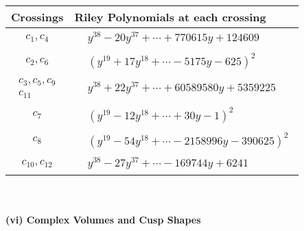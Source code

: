 \documentclass[1p]{elsarticle_modified}
\theoremstyle{definition}
\begin{document}
\begin{tabular}{m{50pt}|m{274pt}}
Crossings & \hspace{64pt}Riley Polynomials at each crossing \\
\hline $$\begin{aligned}c_{1},c_{4}\end{aligned}$$&$\begin{aligned}
&y^{38}-20 y^{37}+\cdots+770615 y+124609
\end{aligned}$\\
\hline $$\begin{aligned}c_{2},c_{6}\end{aligned}$$&$\begin{aligned}
&(y^{19}+17 y^{18}+\cdots-5175 y-625)^{2}
\end{aligned}$\\
\hline $$\begin{aligned}c_{3},c_{5},c_{9}\\c_{11}\end{aligned}$$&$\begin{aligned}
&y^{38}+22 y^{37}+\cdots+60589580 y+5359225
\end{aligned}$\\
\hline $$\begin{aligned}c_{7}\end{aligned}$$&$\begin{aligned}
&(y^{19}-12 y^{18}+\cdots+30 y-1)^{2}
\end{aligned}$\\
\hline $$\begin{aligned}c_{8}\end{aligned}$$&$\begin{aligned}
&(y^{19}-54 y^{18}+\cdots-2158996 y-390625)^{2}
\end{aligned}$\\
\hline $$\begin{aligned}c_{10},c_{12}\end{aligned}$$&$\begin{aligned}
&y^{38}-27 y^{37}+\cdots-169744 y+6241
\end{aligned}$\\
\hline
\end{tabular}\\~\\
\newpage\flushleft \textbf{(vi) Complex Volumes and Cusp Shapes}
\end{document}

